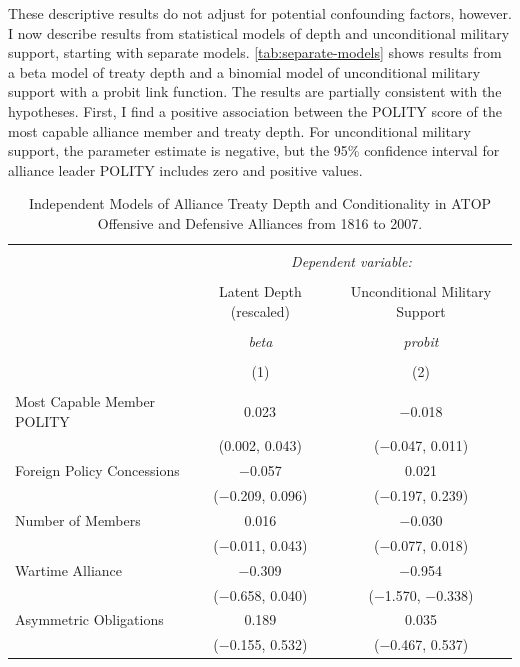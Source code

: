 \documentclass[12pt]{article}
\begin{document}
These descriptive results do not adjust for potential confounding factors, however.
I now describe results from statistical models of depth and unconditional military support, starting with separate models. 
\autoref{tab:separate-models} shows results from a beta model of treaty depth and a binomial model of unconditional military support with a probit link function. 
The results are partially consistent with the hypotheses.
First, I find a positive association between the POLITY score of the most capable alliance member and treaty depth. 
For unconditional military support, the parameter estimate is negative, but the 95\% confidence interval for alliance leader POLITY includes zero and positive values. 


\begin{table}[!htbp] \centering 
  \caption{Independent Models of Alliance Treaty Depth and Conditionality in ATOP Offensive and Defensive Alliances from 1816 to 2007.} 
  \label{tab:separate-models} 
\begin{tabular}{@{\extracolsep{5pt}}lcc} 
\\[-1.8ex]\hline 
\hline \\[-1.8ex] 
 & \multicolumn{2}{c}{\textit{Dependent variable:}} \\ 
\cline{2-3} 
\\[-1.8ex] & Latent Depth (rescaled) & Unconditional Military Support \\ 
\\[-1.8ex] & \textit{beta} & \textit{probit} \\ 
\\[-1.8ex] & (1) & (2)\\ 
\hline \\[-1.8ex] 
  Most Capable Member POLITY & 0.023$^{}$ & $-$0.018 \\ 
  & (0.002, 0.043) & ($-$0.047, 0.011) \\ 
  Foreign Policy Concessions & $-$0.057 & 0.021 \\ 
  & ($-$0.209, 0.096) & ($-$0.197, 0.239) \\ 
  Number of Members & 0.016 & $-$0.030 \\ 
  & ($-$0.011, 0.043) & ($-$0.077, 0.018) \\ 
  Wartime Alliance & $-$0.309$^{}$ & $-$0.954$^{}$ \\ 
  & ($-$0.658, 0.040) & ($-$1.570, $-$0.338) \\ 
  Asymmetric Obligations & 0.189 & 0.035 \\ 
  & ($-$0.155, 0.532) & ($-$0.467, 0.537) \\ 

\end{tabular}
\end{table}
\end{document}
